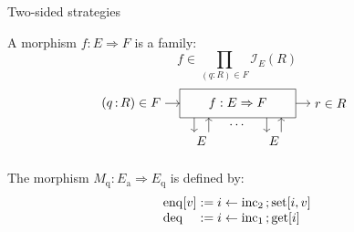 \documentclass[aspectratio=54]{beamer}
\newcommand{\kw}[1]{\ensuremath{ \mathrm{#1} }}
\begin{document}
\begin{frame}{Two-sided strategies} %
  \begin{definition}
    A morphism $f : E \Rightarrow F$ is a family:
    \[
      f \in \prod_{(q : R) \in F} \mathcal{I}_E(R)
    \]
    \[
      \begin{tikzpicture}[scale=0.4]
        \draw[->] (-5,0) node[left] {$(q \mathop{:} R) \in F$} -- (-4,0);
        \draw (-4,-1) rectangle (4,1);
        \draw[->] (4,0) -- (5,0) node[right] {$r \in R$};
        \node (f) at (0,0) {$f : E \Rightarrow F$};
        \draw[->] (-3, -1) -- (-3, -2);
        \draw[->] (-2, -2) -- (-2, -1);
        \node[below] at (0, -1) {$\cdots$};
        \draw[->] (2, -1) -- (2, -2);
        \draw[->] (3, -2) -- (3, -1);
        \node[below] at (-2.5, -2) {$E$};
        \node[below] at ( 2.5, -2) {$E$};
      \end{tikzpicture}
      \qquad
    \]
  \end{definition}
  \pause
  \begin{example}
    The morphism $M_\kw{q} : E_\kw{a} \Rightarrow E_\kw{q}$ is defined by:
    \[
      \begin{array}{l@{}l}
        \kw{enq}[v] & {} :=
          i \leftarrow \kw{inc}_2 \mathop{;} \kw{set}[i, v] \\
        \kw{deq} & {} :=
          i \leftarrow \kw{inc}_1 \mathop{;} \kw{get}[i]
      \end{array}
    \]
  \end{example}
\end{frame}
\end{document}
